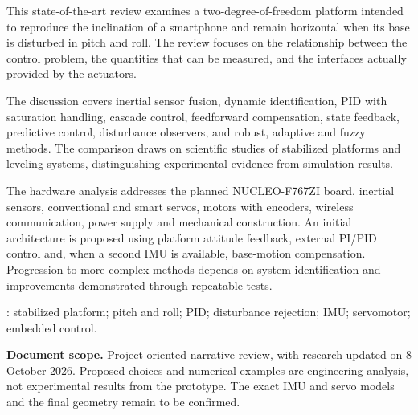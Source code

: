\begin{secondlangabstract}
This state-of-the-art review examines a two-degree-of-freedom platform intended to reproduce the inclination of a smartphone and remain horizontal when its base is disturbed in pitch and roll. The review focuses on the relationship between the control problem, the quantities that can be measured, and the interfaces actually provided by the actuators.

The discussion covers inertial sensor fusion, dynamic identification, PID with saturation handling, cascade control, feedforward compensation, state feedback, predictive control, disturbance observers, and robust, adaptive and fuzzy methods. The comparison draws on scientific studies of stabilized platforms and leveling systems, distinguishing experimental evidence from simulation results.

The hardware analysis addresses the planned NUCLEO-F767ZI board, inertial sensors, conventional and smart servos, motors with encoders, wireless communication, power supply and mechanical construction. An initial architecture is proposed using platform attitude feedback, external PI/PID control and, when a second IMU is available, base-motion compensation. Progression to more complex methods depends on system identification and improvements demonstrated through repeatable tests.

\vspace*{10mm}
\noindent\textbf{\keywordslabel}: stabilized platform; pitch and roll; PID; disturbance rejection; IMU; servomotor; embedded control.

\medskip
\textbf{Document scope.} Project-oriented narrative review, with research updated on 8 October 2026. Proposed choices and numerical examples are engineering analysis, not experimental results from the prototype. The exact IMU and servo models and the final geometry remain to be confirmed.
\end{secondlangabstract}
